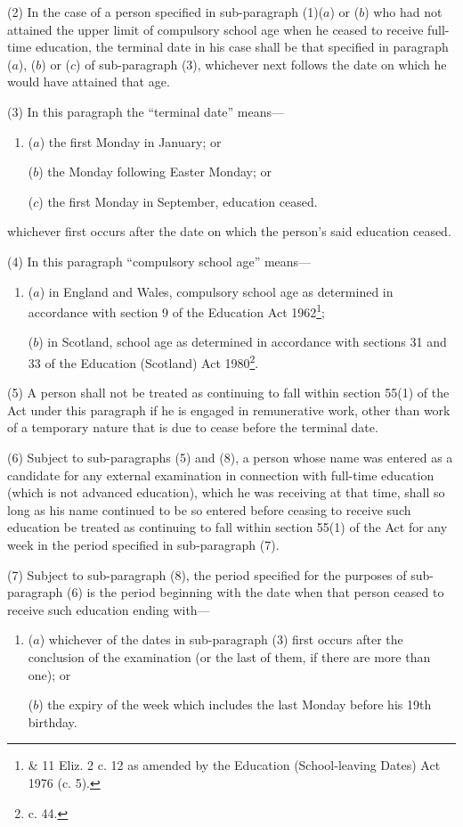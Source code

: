 \documentclass[a4paper,12pt]{article}
\begin{document}
(2) In the case of a person specified in sub-paragraph (1)($a$) or ($b$) who had not attained the upper limit of compulsory school age when he ceased to receive full-time education, the terminal date in his case shall be that specified in paragraph ($a$), ($b$) or ($c$) of sub-paragraph (3), whichever next follows the date on which he would have attained that age.

(3) In this paragraph the “terminal date” means—
\begin{enumerate}\item[]
($a$) the first Monday in January; or

($b$) the Monday following Easter Monday; or

($c$) the first Monday in September, education ceased.
\end{enumerate}
whichever first occurs after the date on which the person’s said education ceased.

(4) In this paragraph “compulsory school age” means—
\begin{enumerate}\item[]
($a$) in England and Wales, compulsory school age as determined in accordance with section 9 of the Education Act 1962\footnote{ \& 11 Eliz. 2 c. 12 as amended by the Education (School-leaving Dates) Act 1976 (c. 5).};

\pagebreak[3]

($b$) in Scotland, school age as determined in accordance with sections 31 and 33 of the Education (Scotland) Act 1980\footnote{ c. 44.}.
\end{enumerate}

(5) A person shall not be treated as continuing to fall within section 55(1) of the Act under this paragraph if he is engaged in remunerative work, other than work of a temporary nature that is due to cease before the terminal date.

(6) Subject to sub-paragraphs (5) and (8), a person whose name was entered as a candidate for any external examination in connection with full-time education (which is not advanced education), which he was receiving at that time, shall so long as his name continued to be so entered before ceasing to receive such education be treated as continuing to fall within section 55(1) of the Act for any week in the period specified in sub-paragraph (7).

(7) Subject to sub-paragraph (8), the period specified for the purposes of sub-paragraph (6) is the period beginning with the date when that person ceased to receive such education ending with—
\begin{enumerate}\item[]
($a$) whichever of the dates in sub-paragraph (3) first occurs after the conclusion of the examination (or the last of them, if there are more than one); or

($b$) the expiry of the week which includes the last Monday before his 19th birthday.
\end{enumerate}
\end{document}
